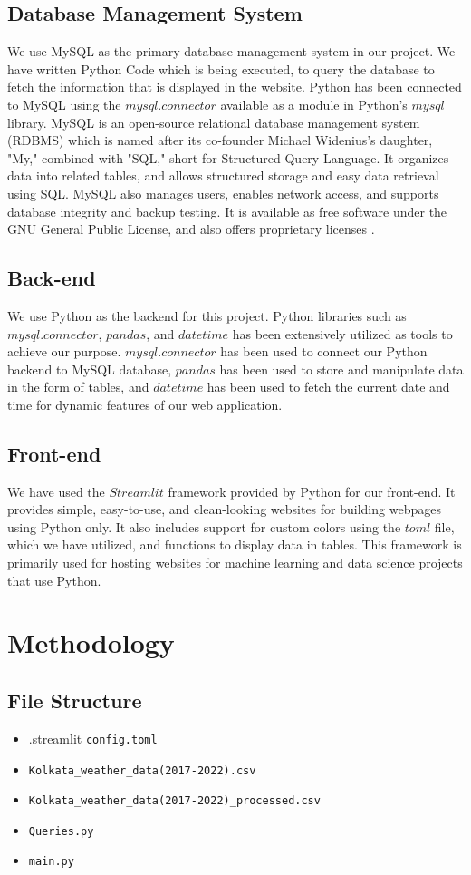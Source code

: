 \documentclass[12pt, a4paper]{article}
\begin{document}
\subsection{Database Management System }
    We use MySQL as the primary database management system in our project. We have written Python Code which is being executed, to query the database to fetch the information that is displayed in the website. Python has been connected to MySQL using the $mysql.connector$ available as a module in Python's $mysql$ library. MySQL is an open-source relational database management system (RDBMS) which is named after its co-founder Michael Widenius's daughter, "My," combined with "SQL," short for Structured Query Language. It organizes data into related tables, and allows structured storage and easy data retrieval using SQL. MySQL also manages users, enables network access, and supports database integrity and backup testing. It is available as free software under the GNU General Public License, and also offers proprietary licenses \cite{wikipediaMySQLWikipedia}.
\subsection{Back-end} 
    We use Python as the backend for this project. Python libraries such as $mysql.connector$, $pandas$, and $datetime$ has been extensively utilized as tools to achieve our purpose. $mysql.connector$ has been used to connect our Python backend to MySQL database, $pandas$ has been used to store and manipulate data in the form of tables, and $datetime$ has been used to fetch the current date and time for dynamic features of our web application.
\subsection{Front-end}
    We have used the $Streamlit$ framework provided by Python for our front-end. It provides simple, easy-to-use, and clean-looking websites for building webpages using Python only. It also includes support for custom colors using the $toml$ file, which we have utilized, and functions to display data in tables. This framework is primarily used for hosting websites for machine learning and data science projects that use Python.
    
\newpage
\section{Methodology}
\subsection{File Structure}
\begin{itemize}
    \item {.streamlit}
        \subitem \texttt{config.toml}
    \item \texttt{Kolkata\_weather\_data(2017-2022).csv}
    \item \texttt{Kolkata\_weather\_data(2017-2022)\_processed.csv}
    \item \texttt{Queries.py}
    \item \texttt{main.py}
\end{itemize}
\newpage
\end{document}

